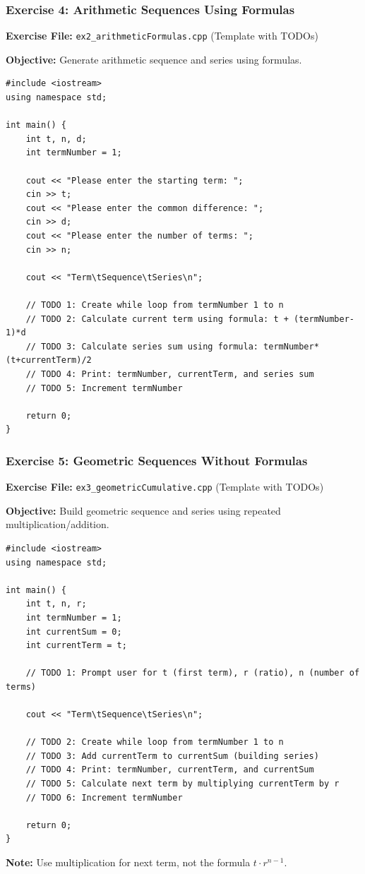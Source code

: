 \documentclass{beamer}
\begin{document}
\begin{frame}[fragile]
\frametitle{Exercise 4: Arithmetic Sequences Using Formulas}
\textbf{Exercise File:} \texttt{ex2\_arithmeticFormulas.cpp} (Template with TODOs)

\pause
\textbf{Objective:} Generate arithmetic sequence and series using formulas.

\begin{verbatim}
#include <iostream>
using namespace std;

int main() {
    int t, n, d;
    int termNumber = 1;
    
    cout << "Please enter the starting term: ";
    cin >> t;
    cout << "Please enter the common difference: ";
    cin >> d;
    cout << "Please enter the number of terms: ";
    cin >> n;
    
    cout << "Term\tSequence\tSeries\n";
    
    // TODO 1: Create while loop from termNumber 1 to n
    // TODO 2: Calculate current term using formula: t + (termNumber-1)*d
    // TODO 3: Calculate series sum using formula: termNumber*(t+currentTerm)/2
    // TODO 4: Print: termNumber, currentTerm, and series sum
    // TODO 5: Increment termNumber
    
    return 0;
}
\end{verbatim}
\end{frame}

\begin{frame}[fragile]
\frametitle{Exercise 5: Geometric Sequences Without Formulas}
\textbf{Exercise File:} \texttt{ex3\_geometricCumulative.cpp} (Template with TODOs)

\pause
\textbf{Objective:} Build geometric sequence and series using repeated multiplication/addition.

\begin{verbatim}
#include <iostream>
using namespace std;

int main() {
    int t, n, r;
    int termNumber = 1;
    int currentSum = 0;
    int currentTerm = t;
    
    // TODO 1: Prompt user for t (first term), r (ratio), n (number of terms)
    
    cout << "Term\tSequence\tSeries\n";
    
    // TODO 2: Create while loop from termNumber 1 to n
    // TODO 3: Add currentTerm to currentSum (building series)
    // TODO 4: Print: termNumber, currentTerm, and currentSum
    // TODO 5: Calculate next term by multiplying currentTerm by r
    // TODO 6: Increment termNumber
    
    return 0;
}
\end{verbatim}

\textbf{Note:} Use multiplication for next term, not the formula $t \cdot r^{n-1}$.
\end{frame}
\end{document}
